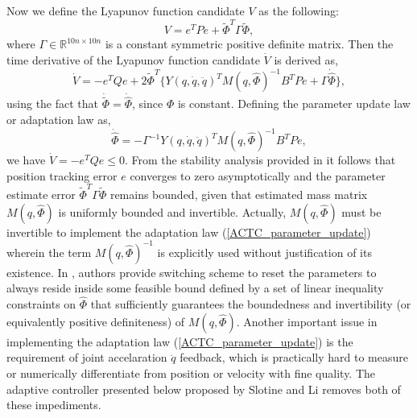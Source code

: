 \documentclass[letterpaper, 10 pt, conference]{ieeeconf}  %
\begin{document}
Now we define the Lyapunov function candidate $V$ as the following:
\begin{equation*}
V = e^{T}Pe + \tilde{\Phi}^{T}\Gamma\tilde{\Phi},
\end{equation*}
where $\Gamma\in\mathbb{R}^{10n\times10n}$ is a constant symmetric positive definite matrix.
Then the time derivative of the Lyapunov function candidate $\dot{V}$ is derived as,
\begin{equation*}
\dot{V} = -e^{T}Qe + 2\tilde{\Phi}^{T}\{Y(q,\dot{q},\ddot{q})^{T}M(q,\hat{\Phi})^{-1}B^{T}Pe+\Gamma\dot{\hat{\Phi}}\},
\end{equation*}
using the fact that $\dot{\tilde{\Phi}} = \dot{\hat{\Phi}}$, since $\Phi$ is constant. Defining the parameter update law or adaptation law as,
\begin{equation}
\dot{\hat{\Phi}} = -\Gamma^{-1}Y(q,\dot{q},\ddot{q})^{T}M(q,\hat{\Phi})^{-1}B^{T}Pe, \label{ACTC_parameter_update}
\end{equation}
we have $\dot{V} = -e^{T}Qe \leq 0$.
From the stability analysis provided in \cite{Craig_AdaptiveControl} it follows that position tracking error $e$ converges to zero asymptotically and the parameter estimate error $\tilde{\Phi}^{T}\Gamma\tilde{\Phi}$ remains bounded, given that estimated mass matrix $M(q,\hat{\Phi})$ is uniformly bounded and invertible. Actually, $M(q,\hat{\Phi})$ must be invertible to implement the adaptation law (\ref{ACTC_parameter_update}) wherein the term $M(q, \hat{\Phi})^{-1}$ is explicitly used without justification of its existence. In \cite{Craig_AdaptiveControl}, authors provide switching scheme to reset the parameters to always reside inside some feasible bound defined by a set of linear inequality constraints on $\hat{\Phi}$ that sufficiently guarantees the boundedness and invertibility (or equivalently positive definiteness) of $M(q,\hat{\Phi})$. Another important issue in implementing the adaptation law (\ref{ACTC_parameter_update}) is the requirement of joint accelaration $\ddot{q}$ feedback, which is practically hard to measure or numerically differentiate from position or velocity with fine quality. The adaptive controller presented below proposed by Slotine and Li \cite{Slotine_AdaptiveControl} removes both of these impediments.

\end{document}
